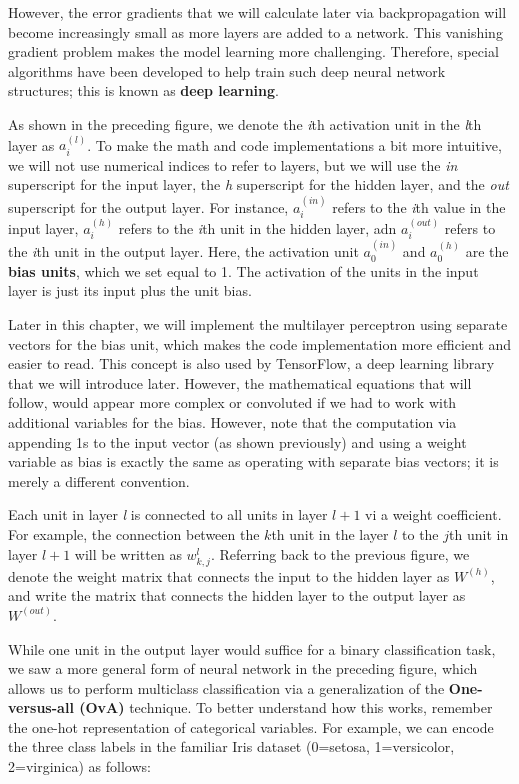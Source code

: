 \documentclass[11pt]{article}
\begin{document}
However, the error gradients that we will calculate later via
backpropagation will become increasingly small as more layers are added
to a network. This vanishing gradient problem makes the model learning
more challenging. Therefore, special algorithms have been developed to
help train such deep neural network structures; this is known as
\textbf{deep learning}.

As shown in the preceding figure, we denote the \emph{i}th activation
unit in the \emph{l}th layer as \(a_i^{(l)}\). To make the math and code
implementations a bit more intuitive, we will not use numerical indices
to refer to layers, but we will use the \emph{in} superscript for the
input layer, the \emph{h} superscript for the hidden layer, and the
\emph{out} superscript for the output layer. For instance,
\(a_i^{(in)}\) refers to the \emph{i}th value in the input layer,
\(a_i^{(h)}\) refers to the \emph{i}th unit in the hidden layer, adn
\(a_i^{(out)}\) refers to the \emph{i}th unit in the output layer. Here,
the activation unit \(a_0^{(in)}\) and \(a_0^{(h)}\) are the
\textbf{bias units}, which we set equal to 1. The activation of the
units in the input layer is just its input plus the unit bias.

Later in this chapter, we will implement the multilayer perceptron using
separate vectors for the bias unit, which makes the code implementation
more efficient and easier to read. This concept is also used by
TensorFlow, a deep learning library that we will introduce later.
However, the mathematical equations that will follow, would appear more
complex or convoluted if we had to work with additional variables for
the bias. However, note that the computation via appending 1s to the
input vector (as shown previously) and using a weight variable as bias
is exactly the same as operating with separate bias vectors; it is
merely a different convention.

Each unit in layer \emph{l} is connected to all units in layer \(l+1\)
vi a weight coefficient. For example, the connection between the \(k\)th
unit in the layer \(l\) to the \(j\)th unit in layer \(l+1\) will be
written as \(w_{k,j}^{l}\). Referring back to the previous figure, we
denote the weight matrix that connects the input to the hidden layer as
\(W^{(h)}\), and write the matrix that connects the hidden layer to the
output layer as \(W^{(out)}\).

While one unit in the output layer would suffice for a binary
classification task, we saw a more general form of neural network in the
preceding figure, which allows us to perform multiclass classification
via a generalization of the \textbf{One-versus-all (OvA)} technique. To
better understand how this works, remember the one-hot representation of
categorical variables. For example, we can encode the three class labels
in the familiar Iris dataset (0=setosa, 1=versicolor, 2=virginica) as
follows:
\end{document}
